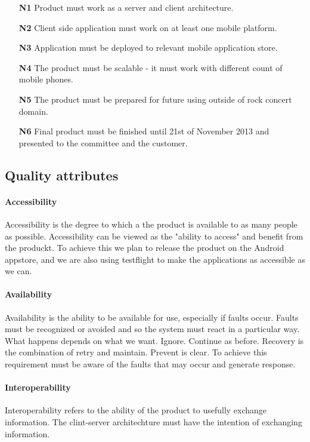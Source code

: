\begin{enumerate}
\item[\textbf{N1}] \label{req_N1} Product must work as a server and client architecture.
\item[\textbf{N2}] \label{req_N2} Client side application must work on at least one mobile platform.
\item[\textbf{N3}] \label{req_N3} Application must be deployed to relevant mobile application store.
\item[\textbf{N4}] \label{req_N4} The product must be scalable - it must work with different count of mobile phones.
\item[\textbf{N5}] \label{req_N5} The product must be prepared for future using outside of rock concert domain.
\item[\textbf{N6}] \label{req_N6} Final product must be finished until 21st of November 2013 and presented to the committee and the customer.
\end{enumerate}

\subsection{Quality attributes}

\paragraph{Accessibility}
Accessibility is the degree to which a the product is available to as many people as possible. 
Accessibility can be viewed as the "ability to access" and benefit from the produckt. 
To achieve this we plan to release the product on the Android appstore, and we are also using testflight to make the applications as accessible as we can.

\paragraph{Availability}

Availability is the ability to be available for use, especially if faults occur. Faults must be recognized or avoided and so the system must react in a particular way. What happens depends on what we want. Ignore. Continue as before. Recovery is the combination of retry and maintain. Prevent is clear. To achieve this requirement must be aware of the faults that may occur and generate response.

\paragraph{Interoperability}
Interoperability refers to the ability of the product to usefully exchange information. The clint-server architechture must have the intention of exchanging information. 

